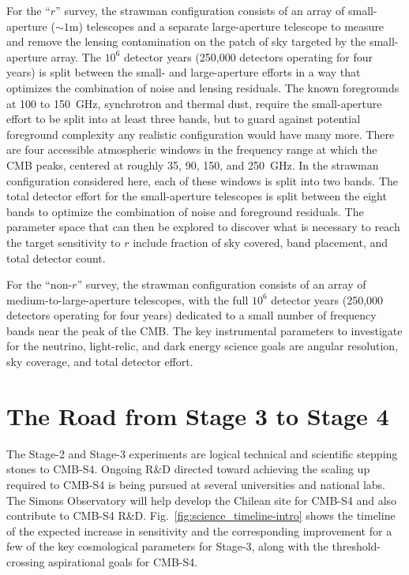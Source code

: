 For the ``$r$'' survey, the strawman configuration consists of an array of small-aperture ($\sim 1$m) telescopes and a separate large-aperture telescope to measure and remove the lensing contamination on the patch of sky targeted by the small-aperture array. The $10^6$ detector years (250,000 detectors operating for four years) is split between the small- and large-aperture efforts in a way that optimizes the combination of noise and lensing residuals. The known foregrounds at 100 to 150~GHz, synchrotron and thermal dust, require the small-aperture effort to be split into at least three bands, but to guard against potential foreground complexity any realistic configuration would have many more. There are four accessible atmospheric windows in the frequency range at which the CMB peaks, centered at roughly 35, 90, 150, and 250~GHz. In the strawman configuration considered here, each of these windows is split into two bands. The total detector effort for the small-aperture telescopes is split between the eight bands to optimize the combination of noise and foreground residuals. The parameter space that can then be explored to discover what is necessary to reach the target sensitivity to $r$ include fraction of sky covered, band placement, and total detector count.

For the ``non-$r$'' survey, the strawman configuration consists of an array of medium-to-large-aperture telescopes,  with the full $10^6$ detector years (250,000 detectors operating for four years) dedicated to a small number of frequency bands near the peak of the CMB. The key instrumental parameters to investigate for the neutrino, light-relic, and dark energy science goals are angular resolution, sky coverage, and total detector effort. 

\section{The Road from Stage 3 to Stage 4}
\label{sec:context}


The Stage-2 and Stage-3 experiments are logical technical and scientific stepping stones to CMB-S4. Ongoing R\&D directed toward achieving the scaling up required to CMB-S4 is being pursued at several universities and national labs. The Simons Observatory will help develop the Chilean site for CMB-S4 and also contribute to CMB-S4 R\&D. 
Fig.~\ref{fig:science_timeline-intro} shows the timeline of the expected increase in sensitivity and the corresponding improvement for a few of the key cosmological parameters for Stage-3, along with the threshold-crossing aspirational goals  for CMB-S4. 

